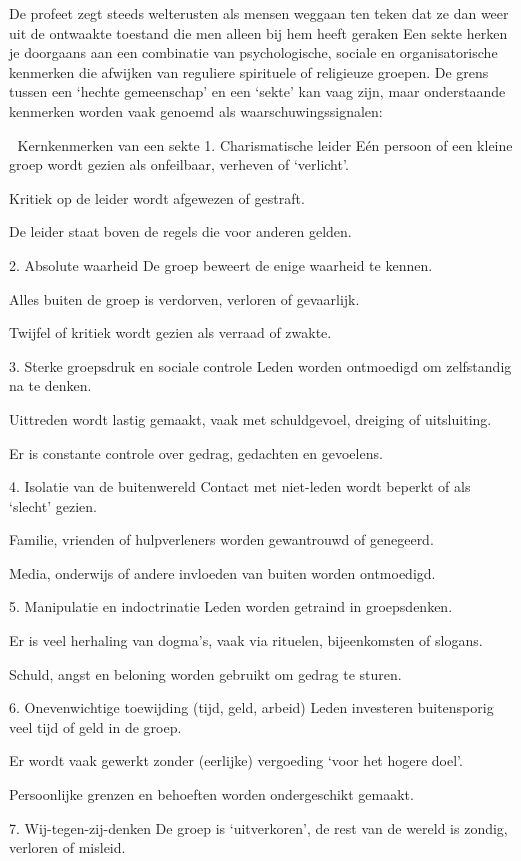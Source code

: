 De profeet zegt steeds welterusten als mensen weggaan ten teken dat ze dan weer uit de ontwaakte toestand die men alleen bij hem heeft geraken
Een sekte herken je doorgaans aan een combinatie van psychologische, sociale en organisatorische kenmerken die afwijken van reguliere spirituele of religieuze groepen. De grens tussen een ‘hechte gemeenschap’ en een ‘sekte’ kan vaag zijn, maar onderstaande kenmerken worden vaak genoemd als waarschuwingssignalen:

🔑 Kernkenmerken van een sekte
1. Charismatische leider
Eén persoon of een kleine groep wordt gezien als onfeilbaar, verheven of ‘verlicht’.

Kritiek op de leider wordt afgewezen of gestraft.

De leider staat boven de regels die voor anderen gelden.

2. Absolute waarheid
De groep beweert de enige waarheid te kennen.

Alles buiten de groep is verdorven, verloren of gevaarlijk.

Twijfel of kritiek wordt gezien als verraad of zwakte.

3. Sterke groepsdruk en sociale controle
Leden worden ontmoedigd om zelfstandig na te denken.

Uittreden wordt lastig gemaakt, vaak met schuldgevoel, dreiging of uitsluiting.

Er is constante controle over gedrag, gedachten en gevoelens.

4. Isolatie van de buitenwereld
Contact met niet-leden wordt beperkt of als ‘slecht’ gezien.

Familie, vrienden of hulpverleners worden gewantrouwd of genegeerd.

Media, onderwijs of andere invloeden van buiten worden ontmoedigd.

5. Manipulatie en indoctrinatie
Leden worden getraind in groepsdenken.

Er is veel herhaling van dogma’s, vaak via rituelen, bijeenkomsten of slogans.

Schuld, angst en beloning worden gebruikt om gedrag te sturen.

6. Onevenwichtige toewijding (tijd, geld, arbeid)
Leden investeren buitensporig veel tijd of geld in de groep.

Er wordt vaak gewerkt zonder (eerlijke) vergoeding ‘voor het hogere doel’.

Persoonlijke grenzen en behoeften worden ondergeschikt gemaakt.

7. Wij-tegen-zij-denken
De groep is ‘uitverkoren’, de rest van de wereld is zondig, verloren of misleid.

